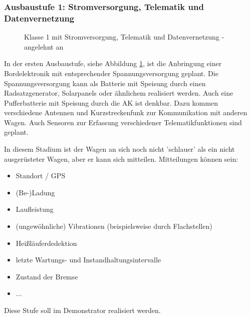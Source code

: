\subsubsection{Ausbaustufe 1: Stromversorgung, Telematik und Datenvernetzung}
\begin{figure}[hbp] 
    
    \caption{Klasse 1 mit Stromversorgung, Telematik und Datenvernetzung - angelehnt an \cite{ETR_3} }
    \label{fig:Klasse1}
\end{figure} 
In der ersten Ausbaustufe, siehe Abbildung \ref{fig:Klasse1}, ist die Anbringung einer Bordelektronik mit  entsprechender Spannungsversorgung geplant. Die Spannungsversorgung kann als Batterie mit Speisung durch einen Radsatzgenerator, Solarpanels oder ähnlichem realisiert werden. Auch eine Pufferbatterie mit Speisung durch die AK ist denkbar. Dazu kommen verschiedene Antennen und Kurzstreckenfunk zur Kommunikation mit anderen Wagen. Auch Sensoren zur Erfassung verschiedener Telematikfunktionen sind geplant.\par
In diesem Stadium ist der Wagen an sich noch nicht 'schlauer' als ein nicht ausgerüsteter Wagen, aber er kann sich mitteilen. Mitteilungen können sein: 
\begin{itemize}
    \item Standort / GPS
    \item (Be-)Ladung
    \item Laufleistung
    \item (ungewöhnliche) Vibrationen (beispielsweise durch Flachstellen)
    \item Heißläuferdedektion
    \item letzte Wartungs- und Instandhaltungsintervalle
    \item Zustand der Bremse
    \item ...
\end{itemize}
Diese Stufe soll im Demonstrator realisiert werden.

